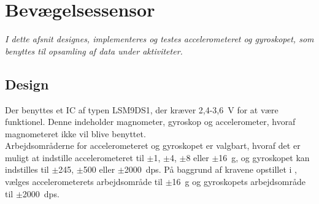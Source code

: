 \section{Bevægelsessensor}\label{sec_design_LSM9DS1}
\textit{I dette afsnit designes, implementeres og testes accelerometeret og gyroskopet, som benyttes til opsamling af data under aktiviteter.}

\subsection{Design} \label{design_lsm}
Der benyttes et IC af typen LSM9DS1, der kræver 2,4-3,6~V for at være funktionel. Denne indeholder magnometer, gyroskop og accelerometer, hvoraf magnometeret ikke vil blive benyttet. \citep{Jimb02016,STMicroelectronics2016} \\ 
Arbejdsområderne for accelerometeret og gyroskopet er valgbart, hvoraf det er muligt at indstille accelerometeret til $\pm$1, $\pm$4, $\pm$8 eller $\pm$16~g, og gyroskopet kan indstilles til $\pm$245, $\pm$500 eller $\pm$2000~dps. \citep{Jimb02016,STMicroelectronics2016} På baggrund af kravene opstillet i , vælges accelerometerets arbejdsområde til $\pm$16~g og gyroskopets arbejdsområde til $\pm$2000~dps. 

